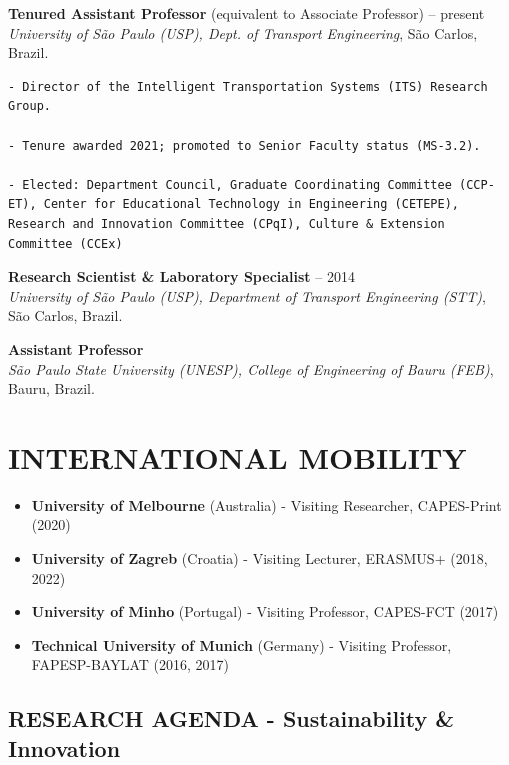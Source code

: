 \documentclass[
  10pt,
  a4paper,
  DIV=11,
  numbers=noendperiod]{scrartcl}
\begin{document}
\textbf{Tenured Assistant Professor} (equivalent to Associate Professor)
 -- present\\
\emph{University of São Paulo (USP), Dept. of Transport Engineering},
São Carlos, Brazil.

\begin{verbatim}
- Director of the Intelligent Transportation Systems (ITS) Research Group.

- Tenure awarded 2021; promoted to Senior Faculty status (MS-3.2).

- Elected: Department Council, Graduate Coordinating Committee (CCP-ET), Center for Educational Technology in Engineering (CETEPE), Research and Innovation Committee (CPqI), Culture & Extension Committee (CCEx)
\end{verbatim}

\textbf{Research Scientist \& Laboratory Specialist}  --
2014\\
\emph{University of São Paulo (USP), Department of Transport Engineering
(STT)}, São Carlos, Brazil.

\textbf{Assistant Professor} \\
\emph{São Paulo State University (UNESP), College of Engineering of
Bauru (FEB)}, Bauru, Brazil.

\hrulefill

\section{INTERNATIONAL MOBILITY}\label{international-mobility}

\begin{itemize}
\item
  \textbf{University of Melbourne} (Australia) - Visiting Researcher,
  CAPES-Print (2020)
\item
  \textbf{University of Zagreb} (Croatia) - Visiting Lecturer, ERASMUS+
  (2018, 2022)
\item
  \textbf{University of Minho} (Portugal) - Visiting Professor,
  CAPES-FCT (2017)
\item
  \textbf{Technical University of Munich} (Germany) - Visiting
  Professor, FAPESP-BAYLAT (2016, 2017)
\end{itemize}

\subsection{RESEARCH AGENDA - Sustainability \&
Innovation}\label{research-agenda---sustainability-innovation}
\end{document}
